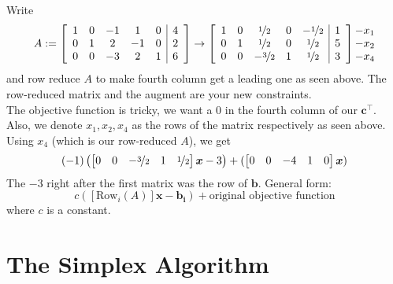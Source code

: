 \begin{exbox}
    \begin{example}
        Write
        \[A:=
            \left[\begin{array}{ccccc|c}
                    1 & 0 & -1 & 1  & 0 & 4 \\
                    0 & 1 & 2  & -1 & 0 & 2 \\
                    0 & 0 & -3 & 2  & 1 & 6
                \end{array}\right]
            \rightarrow
            \left[\begin{array}{ccccc|c}
                    1 & 0 & \nicefrac{1}{2}  & 0 & -\nicefrac{1}{2} & 1 \\
                    0 & 1 & \nicefrac{1}{2}  & 0 & \nicefrac{1}{2}  & 5 \\
                    0 & 0 & -\nicefrac{3}{2} & 1 & \nicefrac{1}{2}  & 3
                \end{array}\right]
            \begin{matrix}
                -x_1 \\
                -x_2 \\
                -x_4
            \end{matrix}
        \]
        and row reduce $A$ to make fourth column get a leading one as seen above.
        The row-reduced matrix and the augment are your new constraints.\\
        The objective function is tricky, we want a 0 in the fourth column of our $\bm{c}^\top $.
        Also, we denote $x_1,x_2,x_4$ as the rows of the matrix respectively as seen above.
        Using $x_4$ (which is our row-reduced $A$), we get
        \[(-1)\left(
            \begin{bmatrix}
                0 & 0 & -\nicefrac{3}{2} & 1 & \nicefrac{1}{2}
            \end{bmatrix}\bm{x}-3\right)+
            (\begin{bmatrix}
                0 & 0 & -4 & 1 & 0
            \end{bmatrix}\bm{x})
        \]
        The $-3$ right after the first matrix was the row of $\bm{b}$. General form:
        \[ c([\text{Row}_i(A)]\bm{x}-\bm{b_i})+\text{original objective function} \]
        where $ c $ is a constant.
    \end{example}
\end{exbox}

\section{The Simplex Algorithm}

